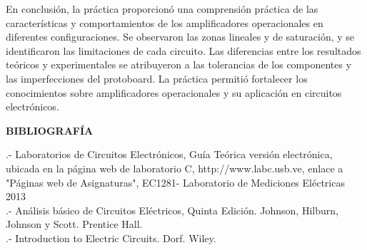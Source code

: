 \documentclass[12pt]{article}
\begin{document}
	En conclusión, la práctica proporcionó una comprensión práctica de las características y comportamientos de los amplificadores operacionales en diferentes configuraciones. Se observaron las zonas lineales y de saturación, y se identificaron las limitaciones de cada circuito. Las diferencias entre los resultados teóricos y experimentales se atribuyeron a las tolerancias de los componentes y las imperfecciones del protoboard. La práctica permitió fortalecer los conocimientos sobre amplificadores operacionales y su aplicación en circuitos electrónicos.\\
	
	\newpage
	
	\begin{center}
		\textbf{\large BIBLIOGRAFÍA}\\
	\end{center}
	
	.- Laboratorios de Circuitos Electrónicos, Guía Teórica versión electrónica, ubicada en la página web de laboratorio C, http://www.labc.usb.ve, enlace a "Páginas web de Asignaturas", EC1281- Laboratorio de Mediciones Eléctricas 2013\\
	
	.- Análisis básico de Circuitos Eléctricos, Quinta Edición. Johnson, Hilburn, Johnson y Scott. Prentice Hall.\\
	
	.- Introduction to Electric Circuits. Dorf. Wiley.
	
\end{document}
